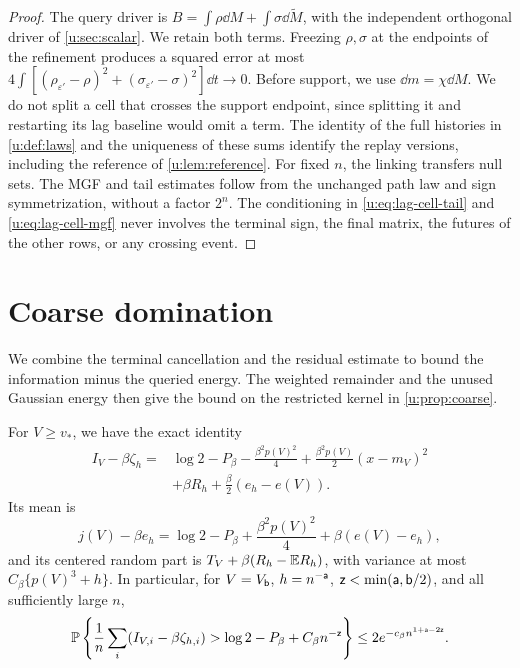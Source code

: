 \begin{proof}
The query driver is $B=\int\rho\dd M+\int\sigma\dd\widetilde M$, with the independent orthogonal driver of \cref{u:sec:scalar}. We retain both terms. Freezing $\rho,\sigma$ at the endpoints of the refinement produces a squared error at most $4\int[(\rho_{\varepsilon'}-\rho)^2+(\sigma_{\varepsilon'}-\sigma)^2]\dd t\to0$.
Before support, we use $\dd m=\chi\dd M$. We do not split a cell that crosses the support endpoint, since splitting it and restarting its lag baseline would omit a term. The identity of the full histories in \cref{u:def:laws} and the uniqueness of these sums identify the replay versions, including the reference of \cref{u:lem:reference}. For fixed $n$, the linking transfers null sets. The MGF and tail estimates follow from the unchanged path law and sign symmetrization, without a factor $2^n$. The conditioning in \eqref{u:eq:lag-cell-tail} and \eqref{u:eq:lag-cell-mgf} never involves the terminal sign, the final matrix, the futures of the other rows, or any crossing event.
\end{proof}

\section{Coarse domination}\label{u:sec:coarse-domination}

We combine the terminal cancellation and the residual estimate to bound the information minus the queried energy. The weighted remainder and the unused Gaussian energy then give the bound on the restricted kernel in \cref{u:prop:coarse}.

\begin{lemma}\label{u:lem:row}
For $V\ge v_*$, we have the exact identity
\begin{equation}\label{u:eq:finite-grid-cancellation}
\begin{aligned}
 I_V-\beta\zeta_h
 ={}&\log2-P_\beta-\frac{\beta^2p(V)^2}{4}
       +\frac{\beta^2p(V)}2(x-m_V)^2\\
 &+\beta R_h+\frac\beta2(e_h-e(V)).
\end{aligned}
\end{equation}
Its mean is
\begin{equation}\label{u:eq:finite-grid-mean}
 j(V)-\beta e_h=\log2-P_\beta+\frac{\beta^2p(V)^2}{4}
                                      +\beta(e(V)-e_h),
\end{equation}
and its centered random part is $T_V+\beta(R_h-\mathbb E R_h)$, with variance at most $C_\beta\{p(V)^3+h\}$. In particular, for $V=V_{\mathsf{b}}$, $h=n^{-\mathsf{a}}$, $\mathsf{z}<\min(\mathsf{a},\mathsf{b}/2)$, and all sufficiently large $n$,
\begin{equation}\label{u:eq:row-concentration}
 \mathbb P\left\{\frac1n\sum_i(I_{V,i}-\beta\zeta_{h,i})
                    >\log2-P_\beta+C_\beta n^{-\mathsf{z}}\right\}
 \le2e^{-c_\beta n^{1+\mathsf{a}-2\mathsf{z}}}.
\end{equation}
\end{lemma}

